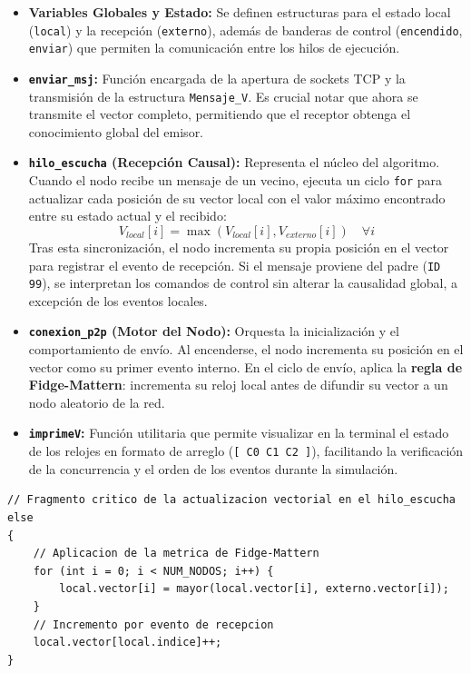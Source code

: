 \begin{itemize}
    \item \textbf{Variables Globales y Estado:} Se definen estructuras para el estado local (\texttt{local}) y la recepción (\texttt{externo}), además de banderas de control (\texttt{encendido}, \texttt{enviar}) que permiten la comunicación entre los hilos de ejecución.
    
    \item \textbf{\texttt{enviar\_msj}:} Función encargada de la apertura de sockets TCP y la transmisión de la estructura \texttt{Mensaje\_V}. Es crucial notar que ahora se transmite el vector completo, permitiendo que el receptor obtenga el conocimiento global del emisor.
    
    \item \textbf{\texttt{hilo\_escucha} (Recepción Causal):} Representa el núcleo del algoritmo. Cuando el nodo recibe un mensaje de un vecino, ejecuta un ciclo \texttt{for} para actualizar cada posición de su vector local con el valor máximo encontrado entre su estado actual y el recibido:
    \[ V_{local}[i] = \max(V_{local}[i], V_{externo}[i]) \quad \forall i \]
    Tras esta sincronización, el nodo incrementa su propia posición en el vector para registrar el evento de recepción. Si el mensaje proviene del padre (\texttt{ID 99}), se interpretan los comandos de control sin alterar la causalidad global, a excepción de los eventos locales.

    \item \textbf{\texttt{conexion\_p2p} (Motor del Nodo):} Orquesta la inicialización y el comportamiento de envío. Al encenderse, el nodo incrementa su posición en el vector como su primer evento interno. En el ciclo de envío, aplica la \textbf{regla de Fidge-Mattern}: incrementa su reloj local antes de difundir su vector a un nodo aleatorio de la red.
    
    \item \textbf{\texttt{imprimeV}:} Función utilitaria que permite visualizar en la terminal el estado de los relojes en formato de arreglo (\texttt{[ C0 C1 C2 ]}), facilitando la verificación de la concurrencia y el orden de los eventos durante la simulación.
\end{itemize}

\begin{lstlisting}[style=estiloC]
// Fragmento critico de la actualizacion vectorial en el hilo_escucha
else 
{
    // Aplicacion de la metrica de Fidge-Mattern
    for (int i = 0; i < NUM_NODOS; i++) {
        local.vector[i] = mayor(local.vector[i], externo.vector[i]);
    }
    // Incremento por evento de recepcion
    local.vector[local.indice]++;
}
\end{lstlisting}

